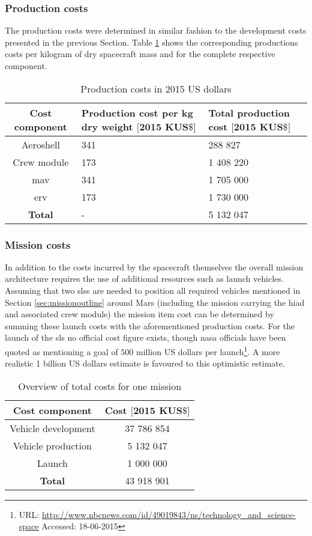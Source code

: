 \subsubsection{Production costs}
The production costs were determined in similar fashion to the development costs presented in the previous Section. Table \ref{tab:productioncosts} shows the corresponding productions costs per kilogram of dry spacecraft mass and for the complete respective component.

\begin{table}[h]
	\centering
	\caption{Production costs in 2015 US dollars}
	\begin{tabular}{|c|p{5cm}|p{5cm}|}
		\hline
		\textbf{Cost component} & \textbf{Production cost per kg dry weight $\mathbf{[2015}$ $\mathbf{K US\$]}$} & \textbf{Total production cost $\mathbf{[2015}$ $\mathbf{K US\$]}$} \\
		\hline \hline
		Aeroshell & 341 & 288 827 \\
		Crew module & 173 & 1 408 220 \\ 
		\acrlong{mav} & 341 & 1 705 000 \\
		\acrlong{erv} & 173 & 1 730 000 \\ \hline
		\textbf{Total} & - & 5 132 047 \\
		\hline
	\end{tabular}
	\label{tab:productioncosts}
\end{table}

\subsubsection{Mission costs}
In addition to the costs incurred by the spacecraft themselves the overall mission architecture requires the use of additional resources such as launch vehicles. Assuming that two \glspl{sls} are needed to position all required vehicles mentioned in Section \ref{sec:missionoutline} around Mars (including the mission carrying the \gls{hiad} and associated crew module) the mission item cost can be determined by summing these launch costs with the aforementioned production costs. For the launch of the \gls{sls} no official cost figure exists, though \gls{nasa} officials have been quoted as mentioning a goal of $500$ million US dollars per launch\footnote{URL: \url{http://www.nbcnews.com/id/49019843/ns/technology_and_science-space} Accessed: 18-06-2015}. A more realistic 1 billion US dollars estimate is favoured to this optimistic estimate.

\begin{table}[H]
	\centering
	\caption{Overview of total costs for one mission}
	\begin{tabular}{|c|c|}
		\hline
		\textbf{Cost component} & \textbf{Cost $\mathbf{[2015}$ $\mathbf{K US\$]}$} \\ \hline 
		\hline
		Vehicle development & 37 786 854 \\
		Vehicle production & 5 132 047\\
		Launch & 1 000 000\\ \hline
		\textbf{Total} & 43 918 901\\ \hline
	\end{tabular}
	\label{tab:missioncosts}
\end{table}

